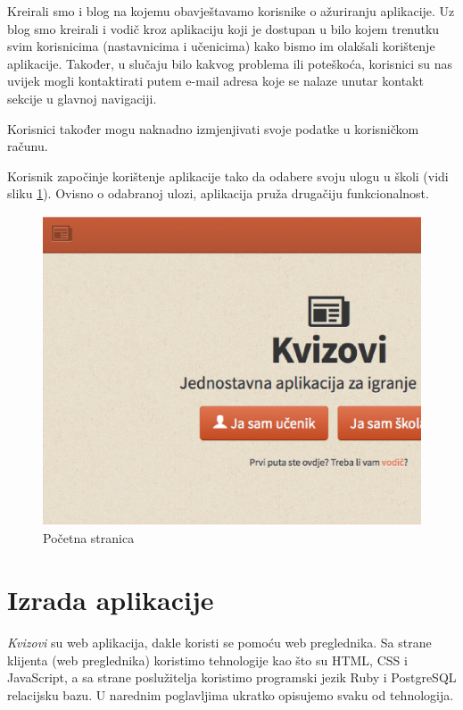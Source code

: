\documentclass[11pt]{scrreprt}
\begin{document}
Kreirali smo i blog na kojemu obavještavamo korisnike o ažuriranju aplikacije.
Uz blog smo kreirali i vodič kroz aplikaciju koji je dostupan u bilo kojem
trenutku svim korisnicima (nastavnicima i učenicima) kako bismo im olakšali
korištenje aplikacije. Također, u slučaju bilo kakvog problema ili poteškoća,
korisnici su nas uvijek mogli kontaktirati putem e-mail adresa koje se nalaze
unutar kontakt sekcije u glavnoj navigaciji.\cite{krug05}

Korisnici također mogu naknadno izmjenjivati svoje podatke u korisničkom
računu.

\pagebreak

Korisnik započinje korištenje aplikacije tako da odabere svoju ulogu u školi
(vidi sliku \ref{fig:home}). Ovisno o odabranoj ulozi, aplikacija pruža drugačiju
funkcionalnost.

\begin{figure}[H]
  \includegraphics[width=\textwidth, clip=true, trim=0 7cm 0 0, fbox]{home}
  \caption{Početna stranica}
  \label{fig:home}
\end{figure}

\section{Izrada aplikacije}

\emph{Kvizovi} su web aplikacija, dakle koristi se pomoću web preglednika. Sa
strane klijenta (web preglednika) koristimo tehnologije kao što su HTML, CSS i
JavaScript, a sa strane poslužitelja koristimo programski jezik Ruby i
PostgreSQL relacijsku bazu. U narednim poglavljima ukratko opisujemo svaku od
tehnologija.
\end{document}
